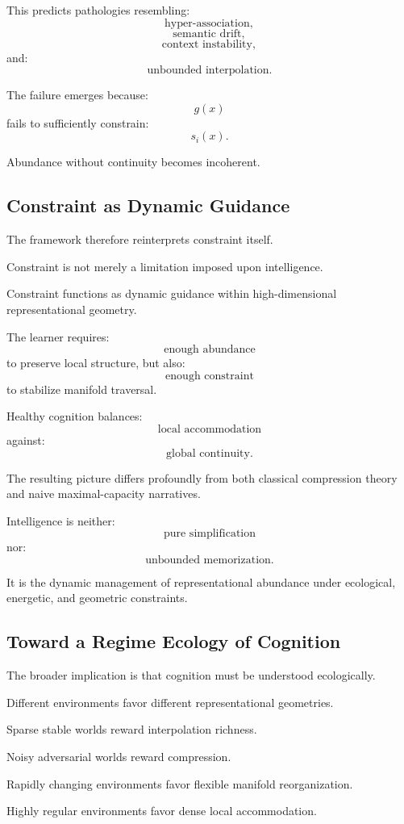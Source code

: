 \documentclass[12pt,a4paper]{article}
\begin{document}
This predicts pathologies resembling:
\[
\text{hyper-association},
\]
\[
\text{semantic drift},
\]
\[
\text{context instability},
\]
and:
\[
\text{unbounded interpolation}.
\]

The failure emerges because:
\[
g(x)
\]
fails to sufficiently constrain:
\[
s_i(x).
\]

Abundance without continuity becomes incoherent.

\subsection{Constraint as Dynamic Guidance}

The framework therefore reinterprets constraint itself.

Constraint is not merely a limitation imposed upon intelligence.

Constraint functions as dynamic guidance within high-dimensional representational geometry.

The learner requires:
\[
\text{enough abundance}
\]
to preserve local structure,
but also:
\[
\text{enough constraint}
\]
to stabilize manifold traversal.

Healthy cognition balances:
\[
\text{local accommodation}
\]
against:
\[
\text{global continuity}.
\]

The resulting picture differs profoundly from both classical compression theory and naive maximal-capacity narratives.

Intelligence is neither:
\[
\text{pure simplification}
\]
nor:
\[
\text{unbounded memorization}.
\]

It is the dynamic management of representational abundance under ecological, energetic, and geometric constraints.

\subsection{Toward a Regime Ecology of Cognition}

The broader implication is that cognition must be understood ecologically.

Different environments favor different representational geometries.

Sparse stable worlds reward interpolation richness.

Noisy adversarial worlds reward compression.

Rapidly changing environments favor flexible manifold reorganization.

Highly regular environments favor dense local accommodation.
\end{document}
